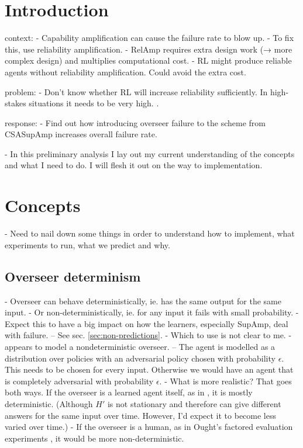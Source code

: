 \section{Introduction}

context:
- Capability amplification can cause the failure rate to blow up.
- To fix this, use reliability amplification.
- RelAmp requires extra design work (→ more complex design) and multiplies
computational cost.
- RL might produce reliable agents without reliability amplification. Could
avoid the extra cost.

problem:
- Don't know whether RL will increase reliability sufficiently. In high-stakes
situations it needs to be very high. \cite[Cf.][]{ChriLearnCata}.

response:
- Find out how introducing overseer failure to the scheme from CSASupAmp
increases overall failure rate.

- In this preliminary analysis I lay out my current understanding of the
concepts and what I need to do. I will flesh it out on the way to
implementation.


\section{Concepts}

- Need to nail down some things in order to understand how to implement, what
experiments to run, what we predict and why.


\subsection{Overseer determinism}

- Overseer can behave deterministically, ie. has the same output for the same
input.
- Or non-deterministically, ie. for any input it fails with small probability.
- Expect this to have a big impact on how the learners, especially SupAmp, deal
with failure. – See sec. \ref{sec:non-predictions}.
- \OQ Which to use is not clear to me.
    - \textcite{ChriRelAmp} appears to model a nondeterministic overseer. – The
    agent is modelled as a distribution over policies with an adversarial policy
    chosen with probability $\epsilon$. This needs to be chosen for every input.
    Otherwise we would have an agent that is completely adversarial with
    probability $\epsilon$.
    - What is more realistic? That goes both ways. If the overseer is a learned
    agent itself, as in \textcite{CSASupAmp}, it is mostly deterministic.
    (Although $H'$ is not stationary and therefore can give different answers
    for the same input over time. However, I'd expect it to become less varied
    over time.)
    - If the overseer is a human, as in Ought's factored evaluation experiments
    \parencite{StuhDelCog}, it would be more non-deterministic.


